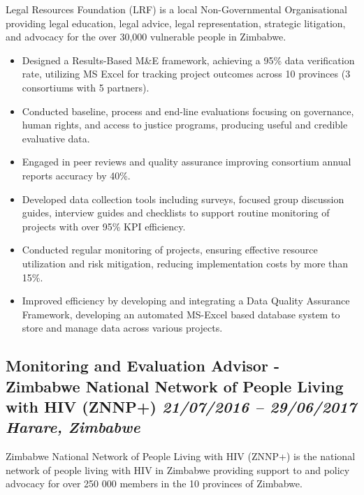 \documentclass[
  10pt,
]{article}
\providecommand{\tightlist}{%
  \setlength{\itemsep}{0pt}\setlength{\parskip}{0pt}}
\begin{document}
Legal Resources Foundation (LRF) is a local Non-Governmental Organisational providing legal education, legal advice, legal representation, strategic litigation, and advocacy for the over 30,000 vulnerable people in Zimbabwe.

\begin{itemize}
\tightlist
\item
Designed a Results-Based M\&E framework, achieving a 95\% data verification rate, utilizing MS Excel for tracking project outcomes across 10 provinces (3 consortiums with 5 partners).
\item
Conducted baseline, process and end-line evaluations focusing on governance, human rights, and access to justice programs, producing useful and credible evaluative data.
\item
Engaged in peer reviews and quality assurance improving consortium annual reports accuracy by 40\%.
\item
Developed data collection tools including surveys, focused group discussion guides, interview guides and checklists to support routine monitoring of projects with over 95\% KPI efficiency.
\item
Conducted regular monitoring of projects, ensuring effective resource utilization and risk mitigation, reducing implementation costs by more than 15\%.
\item
Improved efficiency by developing and integrating a Data Quality Assurance Framework, developing an automated MS-Excel based database system to store and manage data across various projects.
\end{itemize}

\subsection{\texorpdfstring{Monitoring and Evaluation Advisor - Zimbabwe
National Network of People Living with HIV (ZNNP+) \emph{21/07/2016 --
29/06/2017} \textbar{} \emph{Harare, Zimbabwe}}{Monitoring and Evaluation Advisor - Zimbabwe National Network of People Living with HIV (ZNNP+) 21/07/2016 -- 29/06/2017 \textbar{} Harare, Zimbabwe}}\label{monitoring-and-evaluation-advisor---zimbabwe-national-network-of-people-living-with-hiv-znnp-21072016-29062017-harare-zimbabwe}

Zimbabwe National Network of People Living with HIV (ZNNP+) is the national network of people living with HIV in Zimbabwe providing support to and policy advocacy for over 250 000 members in the 10 provinces of Zimbabwe.
\end{document}

